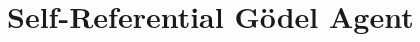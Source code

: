 \documentclass[11pt]{article}
\newcommand{\godel}{G\"odel\xspace}
\newcommand{\framework}{Gödel Agent\xspace}
\begin{document}
\section{Self-Referential \framework{}}

\end{document}

